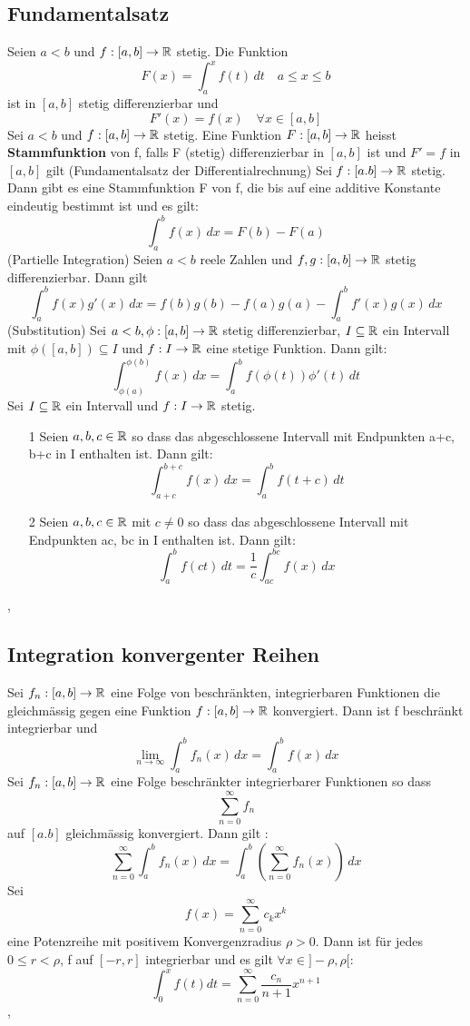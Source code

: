 \subsection{Fundamentalsatz}
 Seien \(a < b\) und \(f: [a,b] \rightarrow \mathbb{R} \) stetig. Die Funktion
\[F(x) = \int_{a}^{x} f(t) \,dt \quad a \leq x \leq b\]
ist in \([a,b]\) stetig differenzierbar und
\[ F'(x) = f(x) \quad \forall x \in [a,b]\]
 Sei \( a < b\) und \(f: [a,b] \rightarrow \mathbb{R}\) stetig. Eine Funktion \(F: [a,b] \rightarrow \mathbb{R}\) heisst \textbf{Stammfunktion} von f, falls F (stetig) differenzierbar in \([a,b]\) ist und \(F'=f\) in \([a,b]\) gilt
 (Fundamentalsatz der Differentialrechnung) Sei \(f:[a.b] \rightarrow \mathbb{R} \) stetig. Dann gibt es eine Stammfunktion F von f, die bis auf eine additive Konstante eindeutig bestimmt ist und es gilt: 
\[ \int_{a}^{b} f(x) \,dx = F(b) - F(a)\]
(Partielle Integration) Seien \(a < b\) reele Zahlen und \(f,g : [a,b] \rightarrow \mathbb{R} \) stetig differenzierbar. Dann gilt
\[\int_{a}^{b} f(x)g'(x) \,dx = f(b)g(b) - f(a)g(a) - \int_{a}^{b} f'(x)g(x) \,dx\]
(Substitution) Sei \(a < b, \phi : [a,b] \rightarrow \mathbb{R} \) stetig differenzierbar, \( I \subseteq \mathbb{R}\) ein Intervall mit \( \phi ([a,b]) \subseteq I \) und \(f: I \rightarrow \mathbb{R} \) eine stetige Funktion. Dann gilt:
\[ \int_{\phi(a)}^{\phi(b)} f(x) \,dx = \int_{a}^{b} f(\phi(t))\phi'(t) \,dt\]
 Sei \( I \subseteq \mathbb{R} \) ein Intervall und \(f: I \rightarrow \mathbb{R}\) stetig.
\begin{enumerate}
    \item [1] Seien \(a,b,c \in \mathbb{R} \) so dass das abgeschlossene Intervall mit Endpunkten a+c, b+c in I enthalten ist. Dann gilt:
    \[ \int_{a+c}^{b+c} f(x) \,dx = \int_{a}^{b} f(t+c) \,dt\]
    \item [2] Seien \(a,b,c \in \mathbb{R} \) mit \( c \neq 0\) so dass das abgeschlossene Intervall mit Endpunkten ac, bc in I enthalten ist. Dann gilt:
    \[\int_{a}^{b} f(ct) \,dt = \frac{1}{c} \int_{ac}^{bc} f(x) \,dx \]
\end{enumerate}
\sep
\subsection{Integration konvergenter Reihen}
 Sei \(f_n : [a,b] \rightarrow \mathbb{R} \) eine Folge von beschränkten, integrierbaren Funktionen die gleichmässig gegen eine Funktion \(f:[a,b] \rightarrow \mathbb{R} \) konvergiert. Dann ist f beschränkt integrierbar und
\[ \lim\limits_{n \rightarrow \infty} \int_{a}^{b} f_n(x) \,dx = \int_{a}^{b} f(x) \,dx \]
 Sei \(f_n : [a,b] \rightarrow \mathbb{R}\) eine Folge beschränkter integrierbarer Funktionen so dass
\[ \sum_{n=0}^\infty f_n\]
auf \([a.b]\) gleichmässig konvergiert. Dann gilt :
\[ \sum_{n=0}^\infty \int_{a}^{b} f_n(x) \,dx = \int_{a}^{b} ( \sum_{n=0}^{\infty} f_n(x)) \,dx \]
 Sei
\[ f(x) = \sum_{n=0}^{\infty} c_kx^k\]
eine Potenzreihe mit positivem Konvergenzradius \( \rho > 0\). Dann ist für jedes \( 0 \leq r < \rho\), f auf \([-r,r]\) integrierbar und es gilt \( \forall x \in ] -\rho, \rho[:\)
\[ \int_{0}^{x} f(t) dt = \sum_{n=0}^{\infty} \frac{c_n}{n+1} x^{n+1}\]
\sep
